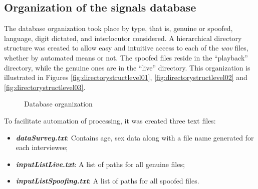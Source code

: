 	\subsection{Organization of the signals database}
		\par The database organization took place by type, that is, genuine or spoofed, language, digit dictated, and interlocutor considered. A hierarchical directory structure was created to allow easy and intuitive access to each of the \textit{wav} files, whether by automated means or not. The spoofed files reside in the ``playback'' directory, while the genuine ones are in the ``live'' directory. This organization is illustrated in Figures \ref{fig:directorystructlevel01}, \ref{fig:directorystructlevel02} and \ref{fig:directorystructlevel03}.		
		\begin{figure}[ht]
			\centering
			\caption{Database organization}
			\label{fig:directorystructlevel010203}
		\end{figure}
		
		\par To facilitate automation of processing, it was created three text files:
		\begin{itemize}
			\item \textit{\textbf{dataSurvey.txt}}: Contains age, sex data along with a file name generated for each interviewee;
			\item \textit{\textbf{inputListLive.txt}}: A list of paths for all genuine files;
			\item \textit{\textbf{inputListSpoofing.txt}}: A list of paths for all spoofed files.
		\end{itemize}
	
